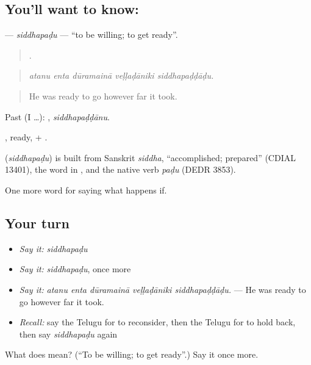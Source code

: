 \subsection*{You'll want to know: }
\textbf{} — \emph{siddhapaḍu} — \textquotedblleft{}to be willing; to get ready\textquotedblright{}.

\begin{quote}
    .
\end{quote}

\begin{quote}
\emph{atanu enta dūramainā veḷḷaḍāniki siddhapaḍḍāḍu.}
\end{quote}

\begin{quote}
He was ready to go however far it took.
\end{quote}

Past (I …): , \emph{siddhapaḍḍānu}.

, ready, + .

\begin{cousinweb}
\textbf{} (\emph{siddhapaḍu}) is built from Sanskrit \emph{siddha}, \textquotedblleft{}accomplished; prepared\textquotedblright{} (CDIAL 13401), the word in , and the native verb \emph{paḍu} (DEDR 3853).
\end{cousinweb}

\begin{grammarlens}[title={What you've built}]
One more word for saying what happens if.
\end{grammarlens}

\subsection*{Your turn}
\begin{itemize}
\raggedright
  \item \emph{Say it:} \emph{siddhapaḍu}
  \item \emph{Say it:} \emph{siddhapaḍu}, once more
  \item \emph{Say it:} \emph{atanu enta dūramainā veḷḷaḍāniki siddhapaḍḍāḍu.} — He was ready to go however far it took.
  \item \emph{Recall:} say the Telugu for to reconsider, then the Telugu for to hold back, then say \emph{siddhapaḍu} again
\end{itemize}

\begin{tcolorbox}[breakable,colback=teal!4,colframe=teal!35!black,title={Before you move on}]
What does  mean? (\textquotedblleft{}To be willing; to get ready\textquotedblright{}.) Say it once more.
\end{tcolorbox}
